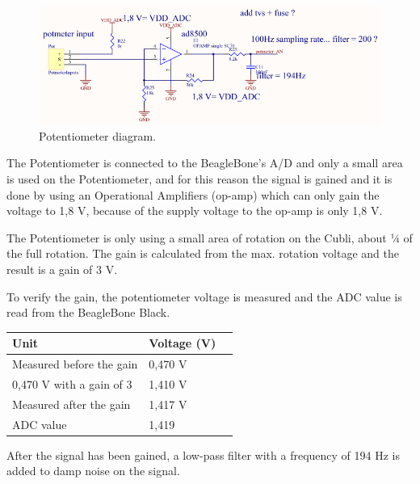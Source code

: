 \begin{figure}[H]
	\centering
	\includegraphics[scale=0.92]{figures/Potmeter.pdf}
	\caption{Potentiometer diagram.}
	\label{labPotmeter}
\end{figure}\vspace{-5mm}

The Potentiometer is connected to the BeagleBone’s A/D and only a small area is used on the Potentiometer, and for this reason the signal is gained and it is done by using an Operational Amplifiers (op-amp) which can only gain the voltage to 1,8 V, because of the supply voltage to the op-amp is only 1,8 V.

The Potentiometer is only using a small area of rotation on the Cubli, about ¼ of the full rotation. The gain is calculated from the max. rotation voltage and the result is a gain of 3 V. 

To verify the gain, the potentiometer voltage is measured and the ADC value is read from the BeagleBone Black.
\begin{table}[H]
	\centering
	\begin{tabular}{|l|l|p{4.3cm}|}
		\hline%
		\textbf{Unit}       &  \textbf{Voltage (V)}         \\
		\hline%
		Measured before the gain                               & 0,470 V           \\
		\hline%
		0,470 V with a gain of 3							  & 1,410 V              \\
		\hline%
		Measured after the gain							  & 1,417 V              \\
		\hline%
		ADC value  							  & 1,419              \\
		\hline%
	\end{tabular}
\end{table}
After the signal has been gained, a low-pass filter with a frequency of 194 Hz is added to damp noise on the signal. 

